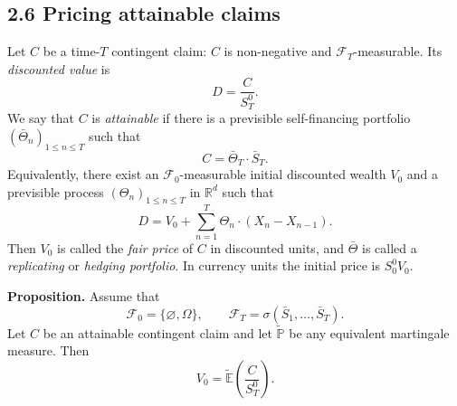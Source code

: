 \documentclass[11pt,a4paper]{article}
\begin{document}
\subsection*{2.6 Pricing attainable claims}

Let $C$ be a time-$T$ contingent claim: $C$ is non-negative and
$\mathcal F_T$-measurable. Its \emph{discounted value} is
\[
D=\frac{C}{S_T^0}.
\]
We say that $C$ is \emph{attainable} if there is a previsible
self-financing portfolio $(\bar\Theta_n)_{1\leq n\leq T}$ such that
\[
C=\bar\Theta_T\cdot\bar S_T.
\]
Equivalently, there exist an $\mathcal F_0$-measurable initial
discounted wealth $V_0$ and a previsible process
$(\Theta_n)_{1\leq n\leq T}$ in $\mathbb R^d$ such that
\[
D=V_0+\sum_{n=1}^T\Theta_n\cdot(X_n-X_{n-1}).
\]
Then $V_0$ is called the \emph{fair price} of $C$ in discounted units,
and $\bar\Theta$ is called a \emph{replicating} or \emph{hedging
portfolio}. In currency units the initial price is $S_0^0V_0$.

\medskip
\noindent\textbf{Proposition.}
Assume that
\[
\mathcal F_0=\{\varnothing,\Omega\},\qquad
\mathcal F_T=\sigma(\bar S_1,\ldots,\bar S_T).
\]
Let $C$ be an attainable contingent claim and let
$\widetilde{\mathbb P}$ be any equivalent martingale measure. Then
\[
\boxed{\displaystyle
V_0=\widetilde{\mathbb E}\!\left(\frac{C}{S_T^0}\right).}
\]
\end{document}
